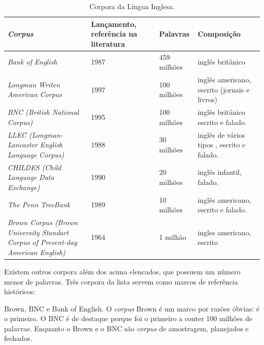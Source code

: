 \begin{table}[H]
   \centering
   \small
   \caption{Corpora da Língua Inglesa.}

   \begin{tabular}{ | p{5cm} | p{3cm} | p{3cm} | p{3cm} | }
      \hline
        \textbf{\emph{Corpus}} & \textbf{Lançamento, referência na literatura} & \textbf{Palavras}& \textbf{Composição}\\
        \hline
        \hline
        \emph{Bank of English} & 1987 \footnotemark[1] & 459 milhões & inglês britânico\\
        \hline
        \emph{Longman Writen American Corpus} & 1997 & 100 milhões  & inglês americano, escrito (jornais e livros)\\
        \hline
        \emph{BNC (British National Corpus)} & 1995 & 100 milhões  & inglês britânico escrito e falado.\\
        \hline
        \emph{LLEC (Longman-Lancaster English Language Corpus)} & 1988 & 30 milhões  & inglês de vários tipos , escrito e falado.\\
        \hline
        \emph{CHILDES (Child Language Data Exchange)} & 1990 & 20 milhões & inglês infantil, falado.\\
        \hline
        \emph{The Penn TreeBank} & 1989 & 10 milhões & inglês americano, escrito e falado.\\
        \hline
        \emph{Brown Corpus (Brown University Standart Corpus of Present-day American English)} & 1964 & 1 milhão  & ingles americano, escrito\\
        \hline
   \end{tabular}
   \label{tbl:corpora}
\end{table}

Existem outros corpora além dos acima elencados, que possuem um número menor de palavras. Três corpora da lista servem como marcos de referência históricos:

Brown, BNC e Bank of English. O \emph{corpus} Brown é um marco por razões óbvias: é o primeiro. O BNC é de destaque porque foi o primeiro a conter 100 milhões de palavras. Enquanto o Brown e o BNC são \emph{corpus} de amostragem, planejados e fechados.



